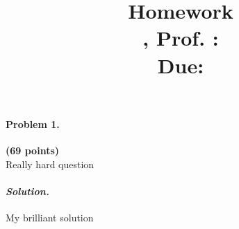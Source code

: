 \documentclass[11pt]{article}
\title{
  \vspace{2in}
  \begin{center}
    \textbf{Homework \hwNum}\\
    \vspace{0.1in}
    \small{\classNum , Prof. \professor : \semester}\\
    \vspace{0.1in}
    \large{Due: \duedate}
  \end{center}
  \vspace{1in}
  \author{\myName}
  \date{\vspace{-5ex}} %
}
\newcommand{\problem}[2]{\paragraph{Problem #1.}\textbf{(#2 points)}\\}
\newcommand{\solution}{\paragraph{\textit{Solution.}}}
\begin{document}
\maketitle \pagebreak

\problem{1}{69}
Really hard question

\solution
My brilliant solution
\end{document}
